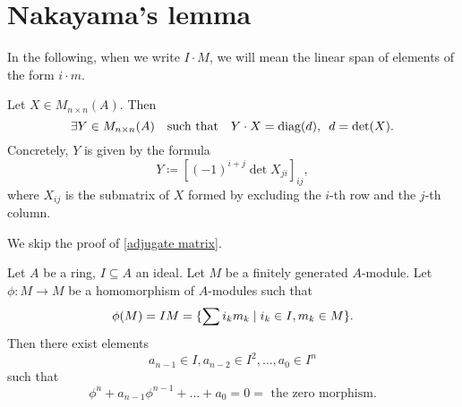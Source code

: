\section{Nakayama's lemma}
\begin{note}
  In the following, when we write $I \cdot M$, we will mean the linear span of elements of the form $i \cdot m$.
\end{note}

\begin{lemma}
  \label{adjugate matrix}
  Let
  $X \in M_{n \times n}(A)$.
  Then
  \[ \exists Y \in M_{n \times n}(A) \quad \text{such that} \quad Y \cdot X = \text{diag}(d), \enspace d = \det(X).\]
  Concretely,
  $Y$ is given by the formula
  \[ Y \coloneqq [ (-1)^{i+j} \det X_{ji} ]_{ij}, \]
  where
  $X_{ij}$ is the submatrix of $X$ formed by excluding the $i$-th row and the $j$-th column.
\end{lemma}

We skip the proof of \cref{adjugate matrix}.

\begin{theorem}
    \label{cayley-hamilton}
  Let \(A\) be a ring, \(I \subseteq A\) an ideal. Let $M$ be a finitely generated $A$-module. Let $\phi: M \to M$ be a homomorphism of $A$-modules such that
  \[ \phi(M) = IM = \{ \sum i_k m_k \mathrel{|} i_k \in I, m_k \in M \}. \]
  Then there exist elements
  \[ a_{n-1} \in I, a_{n-2} \in I^2, \ldots, a_0 \in I^n \]
  such that
  \[ \phi^n + a_{n-1} \phi^{n-1} + \ldots + a_0 = 0 = \text{ the zero morphism}. \]
\end{theorem}

